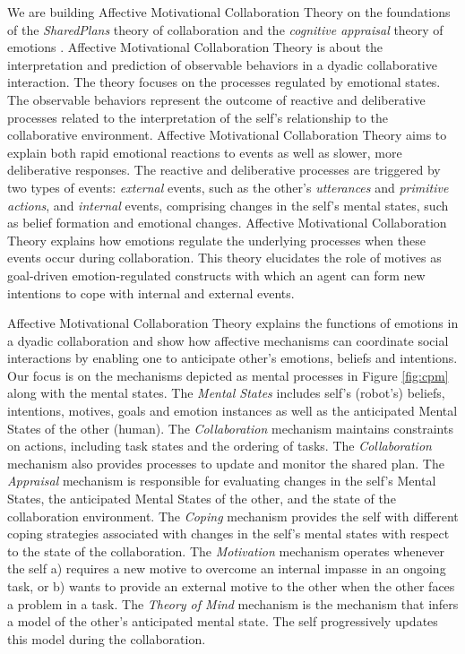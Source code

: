 \documentclass[letterpaper]{article}
\begin{document}
We are building Affective Motivational Collaboration Theory on the foundations
of the \textit{SharedPlans} theory of collaboration \cite{grosz:plans-discourse}
and the \textit{cognitive appraisal} theory of emotions
\cite{gratch:domain-independent}. Affective Motivational Collaboration Theory is
about the interpretation and prediction of observable behaviors in a dyadic
collaborative interaction. The theory focuses on the processes regulated by
emotional states. The observable behaviors represent the outcome of reactive and
deliberative processes related to the interpretation of the self's relationship
to the collaborative environment. Affective Motivational Collaboration Theory
aims to explain both rapid emotional reactions to events as well as slower, more
deliberative responses. The reactive and deliberative processes are triggered by
two types of events: \textit{external} events, such as the other's
\textit{utterances} and \textit{primitive actions}, and \textit{internal}
events, comprising changes in the self's mental states, such as belief formation
and emotional changes. Affective Motivational Collaboration Theory explains how
emotions regulate the underlying processes when these events occur during
collaboration. This theory elucidates the role of motives as goal-driven
emotion-regulated constructs with which an agent can form new intentions to cope
with internal and external events.

Affective Motivational Collaboration Theory explains the functions of emotions
in a dyadic collaboration and show how affective mechanisms can coordinate
social interactions by enabling one to anticipate other's emotions, beliefs and
intentions. Our focus is on the mechanisms depicted as mental processes in
Figure \ref{fig:cpm} along with the mental states. The \textit{Mental States}
includes self's (robot's) beliefs, intentions, motives, goals and emotion
instances as well as the anticipated Mental States of the other (human). The
\textit{Collaboration} mechanism maintains constraints on actions, including
task states and the ordering of tasks. The \textit{Collaboration} mechanism also
provides processes to update and monitor the shared plan. The \textit{Appraisal}
mechanism is responsible for evaluating changes in the self's Mental States, the
anticipated Mental States of the other, and the state of the collaboration
environment. The \textit{Coping} mechanism provides the self with different
coping strategies associated with changes in the self's mental states with
respect to the state of the collaboration. The \textit{Motivation} mechanism
operates whenever the self a) requires a new motive to overcome an internal
impasse in an ongoing task, or b) wants to provide an external motive to the
other when the other faces a problem in a task. The \textit{Theory of Mind}
mechanism is the mechanism that infers a model of the other's anticipated mental
state. The self progressively updates this model during the collaboration.
\end{document}
